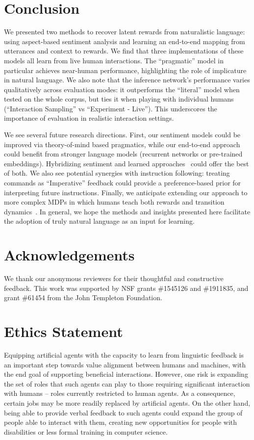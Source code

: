 \documentclass[letterpaper]{article} %
\begin{document}
\section{Conclusion}
\label{conclusion_section}
We presented two methods to recover latent rewards from naturalistic language: using aspect-based sentiment analysis and learning an end-to-end mapping from utterances and context to rewards. We find that three implementations of these models all learn from live human interactions. The ``pragmatic'' model in particular achieves near-human performance, highlighting the role of implicature in natural language. We also note that the inference network's performance varies qualitatively across evaluation modes: it outperforms the ``literal'' model when tested on the whole corpus, but ties it when playing with individual humans (``Interaction Sampling'' vs ``Experiment - Live''). This underscores the importance of evaluation in realistic interaction settings.

We see several future research directions. First, our sentiment models could be improved via theory-of-mind based pragmatics, while our end-to-end approach could benefit from stronger language models (recurrent networks or pre-trained embeddings). Hybridizing sentiment and learned approaches~\cite{jiang2011target, xu2019bertsentiment} could offer the best of both. We also see potential synergies with instruction following: treating commands as ``Imperative'' feedback could provide a preference-based prior for interpreting future instructions. Finally, we anticipate extending our approach to more complex MDPs in which humans teach both rewards and transition dynamics~\cite{narasimhan2018grounding}. In general, we hope the methods and insights presented here facilitate the adoption of truly natural language as an input for learning.



\section*{Acknowledgements}
We thank our anonymous reviewers for their thoughtful and constructive feedback. This work was supported by NSF grants \#1545126 and \#1911835, and grant \#61454 from the John Templeton Foundation.

\section*{Ethics Statement}

Equipping artificial agents with the capacity to learn from linguistic feedback is an important step towards value alignment between humans and machines, with the end goal of supporting beneficial interactions. However, one risk is expanding the set of roles that such agents can play to those requiring significant interaction with humans --  roles currently restricted to human agents. As a consequence, certain jobs may be more readily replaced by artificial agents. On the other hand, being able to provide verbal feedback to such agents could expand the group of people able to interact with them, creating new opportunities for people with disabilities or less formal training in computer science.
\end{document}
